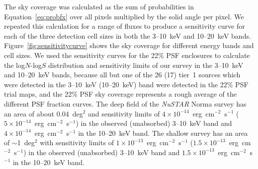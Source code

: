 \documentclass[iop,revtex4]{emulateapj}
\begin{document}
The sky coverage was calculated as the sum of probabilities in Equation~\ref{eq:probfx} over all pixels multiplied by the solid angle per pixel.  We repeated this calculation for a range of fluxes to produce a sensitivity curve for each of the three detection cell sizes in both the 3--10~keV and 10--20~keV bands.  Figure~\ref{fig:sensitivitycurve} shows the sky coverage for different energy bands and cell sizes.  We used the sensitivity curves for the 22\% PSF enclosures to calculate the log$N$-log$S$ distribution and sensitivity limits of our survey in the 3--10~keV and 10--20~keV bands, because all but one of the 26 (17) tier~1 sources which were detected in the 3--10~keV (10--20~keV) band were detected in the 22\% PSF trial maps, and the 22\% PSF sky coverage represents a rough average of the different PSF fraction curves.  The deep field of the \textit{NuSTAR} Norma survey has an area of about 0.04~deg$^2$ and sensitivity limits of $4\times10^{-14}$~erg~cm$^{-2}$~s$^{-1}$ ($5\times10^{-14}$~erg~cm$^{-2}$~s$^{-1}$) in the observed (unabsorbed) 3--10~keV band and $4\times10^{-14}$~erg~cm$^{-2}$~s$^{-1}$ in the 10--20~keV band.  The shallow survey has an area of $\sim$1~deg$^2$ with sensitivity limits of $1\times10^{-13}$~erg~cm$^{-2}$~s$^{-1}$ ($1.5\times10^{-13}$~erg~cm$^{-2}$~s$^{-1}$) in the observed (unabsorbed) 3--10~keV band and $1.5\times10^{-13}$~erg~cm$^{-2}$~s$^{-1}$ in the 10--20~keV band. 
\end{document}
